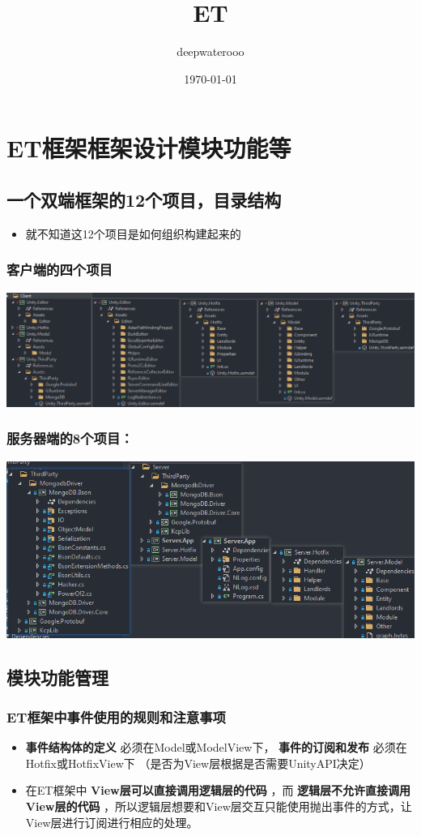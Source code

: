 \documentclass[9pt, b5paper]{article}
\author{deepwaterooo}
\date{\today}
\title{ET}
\begin{document}
\maketitle
\tableofcontents


\section{ET框架框架设计模块功能等}
\label{sec-1}
\subsection{一个双端框架的12个项目，目录结构}
\label{sec-1-1}
\begin{itemize}
\item 就不知道这12个项目是如何组织构建起来的
\end{itemize}
\subsubsection{客户端的四个项目}
\label{sec-1-1-1}

\includegraphics[width=.9\linewidth]{./pic/readme_20230201_200218.png}
\subsubsection{服务器端的8个项目：}
\label{sec-1-1-2}

\includegraphics[width=.9\linewidth]{./pic/readme_20230201_201117.png}
\subsection{模块功能管理}
\label{sec-1-2}
\subsubsection{ET框架中事件使用的规则和注意事项}
\label{sec-1-2-1}
\begin{itemize}
\item \textbf{事件结构体的定义} 必须在Model或ModelView下， \textbf{事件的订阅和发布} 必须在Hotfix或HotfixView下 （是否为View层根据是否需要UnityAPI决定）
\item 在ET框架中 \textbf{View层可以直接调用逻辑层的代码} ，而 \textbf{逻辑层不允许直接调用View层的代码} ，所以逻辑层想要和View层交互只能使用抛出事件的方式，让View层进行订阅进行相应的处理。
\end{itemize}
\end{document}
